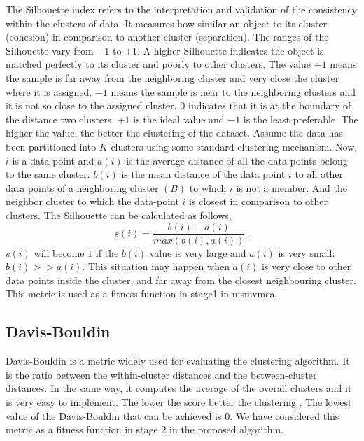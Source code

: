 \documentclass[fleqn,usenatbib]{mnras}
\begin{document}
The Silhouette index refers to the interpretation and validation of the consistency within the clusters of data. It measures how similar an object to its cluster (cohesion) in comparison to another cluster (separation). The ranges of the Silhouette vary from $-1$ to $+1$. A higher Silhouette indicates the object is matched perfectly to its cluster and poorly to other clusters. The value $+1$ means the sample is far away from the neighboring cluster and very close the cluster where it is assigned. $-1$ means the sample is near to the neighboring clusters and it is not so close to the assigned cluster. $0$ indicates that it is at the boundary of the distance two clusters. $+1$ is the ideal value and $-1$ is the least preferable. The higher the value, the better the clustering of the dataset. Assume the data has been partitioned into $K$ clusters using some standard clustering mechanism. Now, $i$ is a data-point and $a(i)$ is the average distance of all the data-points belong to the same cluster. $b(i)$ is the mean distance of the data point $i$ to all other data points of a neighboring cluster $(B)$ to which $i$ is not a member. And the neighbor cluster to which the data-point $i$ is closest in comparison to other clusters. The Silhouette can be calculated as follows,
\begin{equation}
    s(i)=\frac{b(i)-a(i)}{max(b(i),a(i))}\,.
\end{equation}
$s(i)$ will become $1$ if the $b(i)$ value is very large and $a(i)$ is very small: $b(i)>>a(i)$. This situation may happen when $a(i)$ is very close to other data points inside the cluster, and far away from the closest neighbouring cluster. This metric is used as a fitness function in stage1 in \acrshort{msmvmca}.

\subsection{Davis-Bouldin}

Davis-Bouldin is a metric widely used for evaluating the clustering algorithm. It is the ratio between the within-cluster distances and the between-cluster distances. In the same way, it computes the average of the overall clusters and it is very easy to implement. The lower the score better the clustering \citep{Davies}. The lowest value of the Davis-Bouldin that can be achieved is $0$. We have considered this metric as a fitness function in stage 2 in the proposed algorithm.



\label{lastpage}
\end{document}

